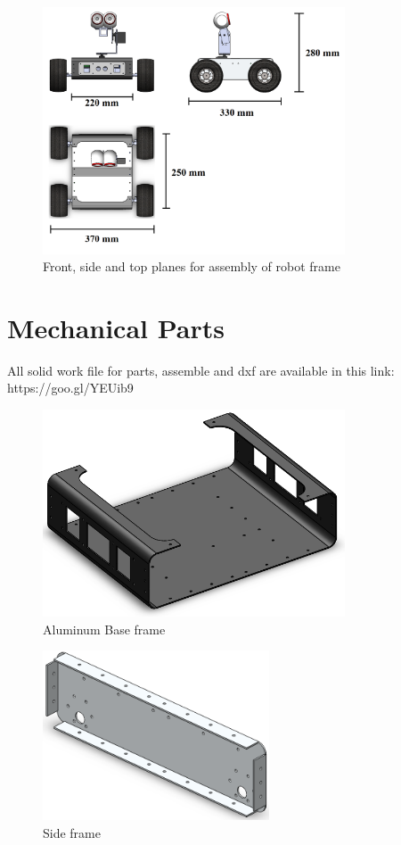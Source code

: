 \documentclass[12pt]{book}
\begin{document}
\begin{figure}
	\centering
	\includegraphics[width =0.8\textwidth]{Fig/solid/solid-planes.png}
	\caption{Front, side and top planes for assembly of robot frame}
	\label{fig:frame-planes}
\end{figure}


\section{Mechanical Parts}
All solid work file for parts, assemble and dxf are available in this link:
 https://goo.gl/YEUib9


\begin{figure}
	\centering
	\includegraphics[width =0.8\textwidth]{Fig/solid/frame-3d.png}
	\caption{Aluminum Base frame}
\end{figure}

\begin{figure}
	\centering
	\includegraphics[width =0.6\textwidth]{Fig/solid/side-frame.png}
	\caption{Side frame}
\end{figure}
\end{document}
